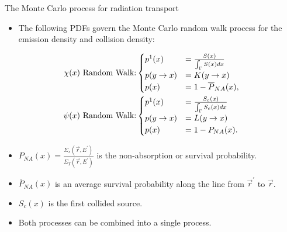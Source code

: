 \documentclass{beamer}
\begin{document}
\begin{frame}{The Monte Carlo process for radiation transport}

  \begin{itemize}
    \item The following PDFs govern the Monte Carlo random walk process
      for the emission density and collision density:
  \end{itemize}

  \begin{align}
    \chi(x)\text{ Random Walk:} &
    \begin{cases}
      p^1(x) & = \frac{S(x)}{\int_{\Gamma} S(x)dx} \\
      p(y \to x) &  = K(y \to x) \\
      p(x) & = 1 - \overline{P}_{NA}(x),
    \end{cases} \nonumber \\ \medskip
    \psi(x)\text{ Random Walk:} &
    \begin{cases}
      p^1(x) & = \frac{S_c(x)}{\int_{\Gamma} S_c(x)dx} \\
      p(y \to x) & = L(y \to x) \\
      p(x) & = 1 - P_{NA}(x).
    \end{cases}
    \nonumber
  \end{align}

  \begin{itemize}
    \item $P_{NA}(x) = \frac{\Sigma_s(\vec{r},E^{'})}{\Sigma_T(\vec{r},E^{'})}$ is
      the non-absorption or survival probability.
    \item $\overline{P}_{NA}(x)$ is an average survival probability along the 
      line from $\vec{r}^{'}$ to $\vec{r}$.
    \item $S_c(x)$ is the first collided source.
    \item Both processes can be combined into a single process.
  \end{itemize}
    
\end{frame}
\end{document}
